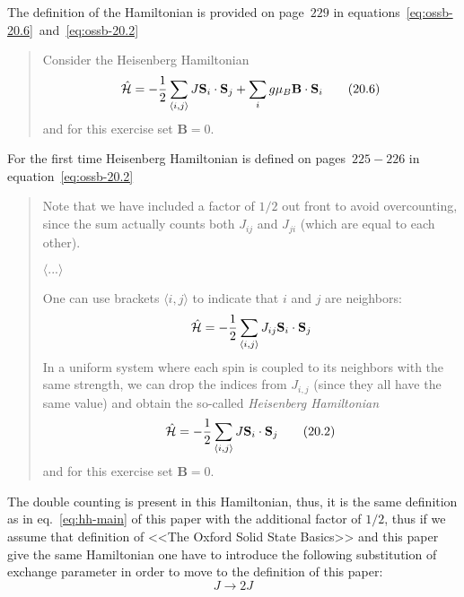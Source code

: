     The definition of the Hamiltonian is provided on page~$229$ in equations~\eqref{eq:ossb-20.6}~and~\eqref{eq:ossb-20.2}

    \begin{quote}
        Consider the Heisenberg Hamiltonian
        \begin{equation}
            \hat{\mathcal{H}} = -\dfrac{1}{2}\sum_{\langle i,j \rangle} J \mathbf{S}_i \cdot \mathbf{S}_j + \sum_i g\mu_B \mathbf{B} \cdot \mathbf{S}_i \label{eq:ossb-20.6} \tag{20.6}
        \end{equation}
        and  for this exercise set $\mathbf{B} = 0$.
    \end{quote}

    For the first time Heisenberg Hamiltonian is defined on pages~$225-226$ in equation~\eqref{eq:ossb-20.2}
    \begin{quote}
        Note that we have included a factor of $1/2$ out front to avoid overcounting, since the sum actually counts both $J_{ij}$ and $J_{ji}$ (which are equal to each other).

        $\langle ... \rangle$

        One can use brackets $\langle i,j\rangle$ to indicate that $i$ and $j$ are neighbors:
        \begin{equation}
            \hat{\mathcal{H}} = -\dfrac{1}{2}\sum_{\langle i,j \rangle} J_{ij} \mathbf{S}_i \cdot \mathbf{S}_j
        \end{equation}
        In a uniform system where each spin is coupled to its neighbors with the same strength, we can drop the indices from $J_{i,j}$ (since they all have the same value) and obtain the so-called \textit{Heisenberg Hamiltonian}
        \begin{equation}
            \hat{\mathcal{H}} = -\dfrac{1}{2}\sum_{\langle i,j \rangle} J \mathbf{S}_i \cdot \mathbf{S}_j \label{eq:ossb-20.2} \tag{20.2}
        \end{equation}
        and  for this exercise set $\mathbf{B} = 0$.
    \end{quote}

    The double counting is present in this Hamiltonian, thus, it is the same definition as in eq.~\eqref{eq:hh-main} of this paper 
    with the additional factor of $1/2$, thus if we assume that definition of <<The Oxford Solid State Basics>> and this paper give the same Hamiltonian one have to 
    introduce the following substitution of exchange parameter in order to move to the definition of this paper:
    \begin{equation}
        J \rightarrow 2J \label{eq:ossb-sub}
    \end{equation}

